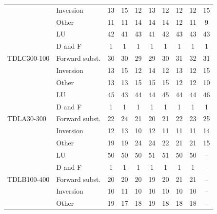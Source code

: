 \begin{table}[htbp]
\begin{tabular}{llcccccccc}
 & Inversion & 13 & 15 & 12 & 13 & 12 & 12 & 12 & 15 \\
 & Other & 11 & 11 & 14 & 14 & 14 & 12 & 11 & 9 \\
\midrule
\multirow{5}{*}{TDLC300-100} & LU & 42 & 41 & 43 & 41 & 42 & 43 & 43 & 43 \\
 & D and F & 1 & 1 & 1 & 1 & 1 & 1 & 1 & 1 \\
 & Forward subst. & 30 & 30 & 29 & 29 & 30 & 31 & 32 & 31 \\
 & Inversion & 13 & 15 & 12 & 14 & 12 & 13 & 12 & 15 \\
 & Other & 13 & 13 & 15 & 15 & 15 & 12 & 12 & 10 \\
\midrule
\multirow{5}{*}{TDLA30-300} & LU & 45 & 43 & 44 & 44 & 45 & 44 & 44 & 46 \\
 & D and F & 1 & 1 & 1 & 1 & 1 & 1 & 1 & 1 \\
 & Forward subst. & 22 & 24 & 21 & 20 & 21 & 22 & 23 & 25 \\
 & Inversion & 12 & 13 & 10 & 12 & 11 & 11 & 11 & 14 \\
 & Other & 19 & 19 & 24 & 24 & 22 & 21 & 21 & 15 \\
\midrule
\multirow{5}{*}{TDLB100-400} & LU & 50 & 50 & 50 & 51 & 51 & 50 & 50 & -- \\
 & D and F & 1 & 1 & 1 & 1 & 1 & 1 & 1 & -- \\
 & Forward subst. & 20 & 20 & 20 & 19 & 20 & 21 & 21 & -- \\
 & Inversion & 10 & 11 & 10 & 10 & 10 & 10 & 10 & -- \\
 & Other & 19 & 17 & 18 & 19 & 18 & 18 & 18 & -- \\
\bottomrule
\end{tabular}
\vspace{4pt}
\end{table}
